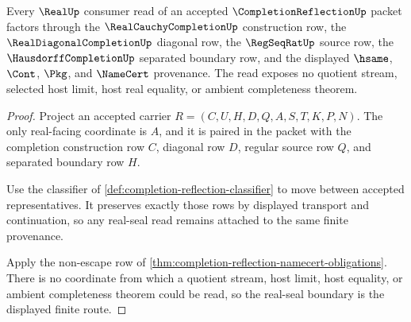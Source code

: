 \begin{theorem}
\label{thm:completion-reflection-real-seal-boundary}
Every $\RealUp$ consumer read of an accepted $\CompletionReflectionUp$ packet factors through the $\RealCauchyCompletionUp$ construction row, the $\RealDiagonalCompletionUp$ diagonal row, the $\RegSeqRatUp$ source row, the $\HausdorffCompletionUp$ separated boundary row, and the displayed $\hsame$, $\Cont$, $\Pkg$, and $\NameCert$ provenance. The read exposes no quotient stream, selected host limit, host real equality, or ambient completeness theorem.
\end{theorem}
\begin{proof}
Project an accepted carrier $R=(C,U,H,D,Q,A,S,T,K,P,N)$. The only real-facing coordinate is $A$, and it is paired in the packet with the completion construction row $C$, diagonal row $D$, regular source row $Q$, and separated boundary row $H$.

Use the classifier of \autoref{def:completion-reflection-classifier} to move between accepted representatives. It preserves exactly those rows by displayed transport and continuation, so any real-seal read remains attached to the same finite provenance.

Apply the non-escape row of \autoref{thm:completion-reflection-namecert-obligations}. There is no coordinate from which a quotient stream, host limit, host equality, or ambient completeness theorem could be read, so the real-seal boundary is the displayed finite route.
\end{proof}

